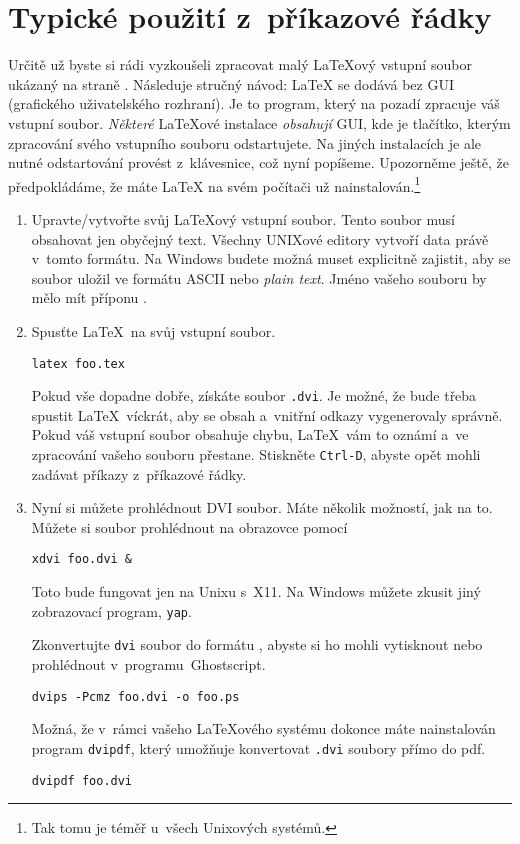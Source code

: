 \section{Typické použití z~příkazové řádky}

Určitě už byste si rádi vyzkoušeli zpracovat malý \LaTeX ový vstupní 
soubor ukázaný na straně \pageref{mini}. Následuje stručný návod:
\LaTeX{} se dodává bez GUI (grafického uživatelského rozhraní). Je to
 program, který na pozadí zpracuje váš vstupní soubor.
\emph{Některé} \LaTeX ové instalace \emph{obsahují} GUI, kde je tlačítko, kterým
zpracování svého vstupního souboru odstartujete. Na jiných instalacích
je ale nutné odstartování provést z~klávesnice, což nyní
popíšeme. Upozorněme ještě, že předpokládáme, že máte \LaTeX{} na svém
počítači už nainstalován.\footnote{Tak tomu je téměř u~všech Unixových
systémů.}


\begin{enumerate}
\item 
  Upravte/vytvořte svůj \LaTeX ový vstupní soubor. Tento soubor musí
  obsahovat jen obyčejný text. Všechny UNIXové editory vytvoří data právě
  v~tomto formátu. Na Windows budete možná muset explicitně zajistit, aby se
  soubor uložil ve formátu ASCII nebo \emph{plain text}. Jméno vašeho
  souboru by mělo mít příponu .
  
\item 
Spusťte \LaTeX\ na svůj vstupní soubor.

\begin{lscommand}
\verb+latex foo.tex+
\end{lscommand}

Pokud vše dopadne dobře, získáte
soubor \texttt{.dvi}. Je možné, že bude třeba spustit \LaTeX\ víckrát,
aby se obsah a~vnitřní odkazy vygenerovaly správně. Pokud váš vstupní
soubor obsahuje chybu, \LaTeX\ vám to oznámí a~ve zpracování vašeho souboru
přestane. Stiskněte \texttt{Ctrl-D}, abyste opět mohli zadávat příkazy
z~příkazové řádky.

\item 
Nyní si můžete prohlédnout DVI soubor. Máte několik možností, jak na to. Můžete
si soubor prohlédnout na obrazovce pomocí
\begin{lscommand}
\verb+xdvi foo.dvi &+
\end{lscommand}
Toto bude fungovat jen na Unixu s~X11. Na Windows můžete zkusit jiný
zobrazovací program, \texttt{yap}.

Zkonvertujte \verb|dvi| soubor do formátu \PSib, abyste si ho mohli vytisknout nebo
prohlédnout v~programu~Ghostscript.
\begin{lscommand}
\verb+dvips -Pcmz foo.dvi -o foo.ps+
\end{lscommand}

Možná, že v~rámci vašeho \LaTeX ového systému dokonce máte nainstalován program
\texttt{dvipdf}, který umožňuje konvertovat \texttt{.dvi} soubory přímo do pdf.
\begin{lscommand}
\verb+dvipdf foo.dvi+
\end{lscommand}

\end{enumerate}

